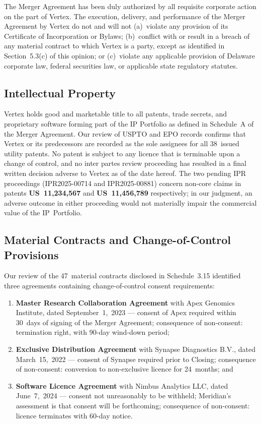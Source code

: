\documentclass[11pt,a4paper]{scrartcl}
\begin{document}
\begin{tcolorbox}[sideline]
The Merger Agreement has been duly authorized by all requisite corporate action on the part of
Vertex. The execution, delivery, and performance of the Merger Agreement by Vertex do not and
will not (a)~violate any provision of its Certificate of Incorporation or Bylaws; (b)~conflict
with or result in a breach of any material contract to which Vertex is a party, except as
identified in Section~5.3(c) of this opinion; or (c)~violate any applicable provision of
Delaware corporate law, federal securities law, or applicable state regulatory statutes.
\end{tcolorbox}

\subsection{Intellectual Property}

Vertex holds good and marketable title to all patents, trade secrets, and proprietary software
forming part of the IP Portfolio as defined in Schedule~A of the Merger Agreement. Our review
of USPTO and EPO records confirms that Vertex or its predecessors are recorded as the sole
assignees for all 38~issued utility patents. No patent is subject to any licence that is
terminable upon a change of control, and no inter partes review proceeding has resulted in
a final written decision adverse to Vertex as of the date hereof. The two pending IPR
proceedings (IPR2025-00714 and IPR2025-00881) concern non-core claims in patents
\textbf{US~11,234,567} and \textbf{US~11,456,789} respectively; in our judgment, an adverse
outcome in either proceeding would not materially impair the commercial value of the IP~Portfolio.

\subsection{Material Contracts and Change-of-Control Provisions}

Our review of the 47~material contracts disclosed in Schedule~3.15 identified three agreements
containing change-of-control consent requirements:

\begin{enumerate}[label=\lbrack\arabic*\rbrack]
  \item \textbf{Master Research Collaboration Agreement} with Apex Genomics Institute, dated
    September~1,~2023 --- consent of Apex required within 30~days of signing of the Merger
    Agreement; consequence of non-consent: termination right, with 90-day wind-down period;
  \item \textbf{Exclusive Distribution Agreement} with Synapse Diagnostics B.V., dated
    March~15,~2022 --- consent of Synapse required prior to Closing; consequence of
    non-consent: conversion to non-exclusive licence for 24~months; and
  \item \textbf{Software Licence Agreement} with Nimbus Analytics LLC, dated June~7,~2024 ---
    consent not unreasonably to be withheld; Meridian's assessment is that consent will be
    forthcoming; consequence of non-consent: licence terminates with 60-day notice.
\end{enumerate}
\end{document}
